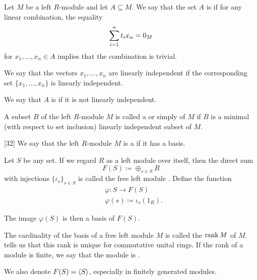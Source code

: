 \begin{definition}\label{def:left_module_linear_dependence}
  Let \( M \) be a left \( R \)-module and let \( A \subseteq M \). We say that the set \( A \) is  if for any linear combination, the equality
  \begin{equation*}
    \sum_{i=1}^n t_i x_\alpha = 0_M
  \end{equation*}
  for \( x_1, \ldots, x_n \in A \) implies that the combination is trivial.

  We say that the vectors \( x_1, \ldots, x_n \) are linearly independent if the corresponding set \( \{ x_1, \ldots, x_n \} \) is linearly independent.

  We say that \( A \) is  if it is not linearly independent.
\end{definition}

\begin{definition}\label{def:left_module_hamel_basis}
  A subset \( B \) of the left \( R \)-module \( M \) is called a  or simply  of \( M \) if \( B \) is a minimal (with respect to set inclusion) linearly independent subset of \( M \).
\end{definition}

\begin{definition}\label{def:free_left_module}[32]\cite[377]{Knapp2016BAlg}
  We say that the left \( R \)-module \( M \) is a  if it has a basis.

  Let \( S \) be any set. If we regard \( R \) as a left module over itself, then the direct sum
  \begin{equation*}
    F(S) \coloneqq \oplus_{s \in S} R
  \end{equation*}
  with injections \( \{ \iota_s \}_{s \in S} \) is called the free left module . Define the function
  \begin{align*}
    &\varphi: S \to F(S) \\
    &\varphi(s) \coloneqq \iota_s(1_R).
  \end{align*}

  The image \( \varphi(S) \) is then a basis of \( F(S) \).

  The cardinality of the basis of a free left module \( M \) is called the  \( \operatorname{rank} M \) of \( M \).  tells us that this rank is unique for commutative unital rings. If the rank of a module is finite, we say that the module is .

  We also denote \( F(S) = \left\langle S \right\rangle \), especially in finitely generated modules.
\end{definition}

